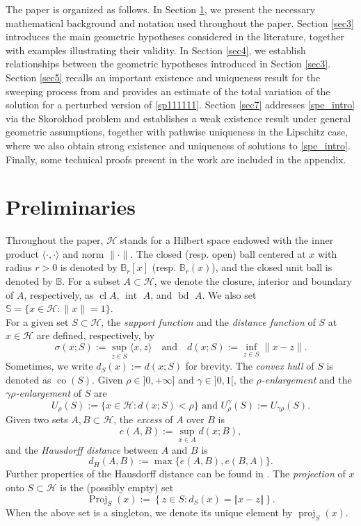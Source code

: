 \documentclass[preprint,12pt]{elsarticle}
\renewcommand{\H}{\mathcal{H}}
\newcommand{\cl}{{\operatorname{cl}}}
\newcommand{\inte}{{\operatorname{int \  }}}
\newcommand{\bd}{{\operatorname{bd \ }}}
\theoremstyle{plain}
\theoremstyle{definition}
\theoremstyle{remark}
\begin{document}
 The paper is organized as follows. In Section \ref{sec2}, we present the necessary mathematical background and notation used throughout the paper. Section \ref{sec3} introduces the main geometric hypotheses considered in the literature, together with examples illustrating their validity. In Section \ref{sec4}, we establish relationships between the geometric hypotheses introduced in Section \ref{sec3}. Section \ref{sec5} recalls an important existence and uniqueness result for the sweeping process from \cite{MR1946545} and provides an estimate of the total variation of the solution for a perturbed version of \eqref{sp111111}. Section \ref{sec7} addresses \eqref{spe_intro} via the Skorokhod problem and establishes a weak existence result under general geometric assumptions, together with pathwise uniqueness in the Lipschitz case, where we also obtain strong existence and uniqueness of solutions to \eqref{spe_intro}. Finally, some technical proofs present in the work are included in the appendix.


\section{Preliminaries}\label{sec2}
	
	Throughout the paper, $\H$ stands for a Hilbert space endowed with the inner product $\langle\cdot,\cdot\rangle$ and norm $\|\cdot\|$. The closed (resp. open) ball centered at $x$ with radius $r>0$ is denoted by $\mathbb{B}_r[x]$ (resp. $\mathbb{B}_r(x)$), and the closed unit ball is denoted by $\mathbb{B}$. For a subset $A\subset\H$, we denote the closure, interior and boundary of $A$, respectively, as $\cl A$, $\inte A$, and $\bd A$. We also set $\mathbb{S} = \{x\in\H : \|x\| = 1\}$.\\
	For a given set $S\subset \H$, the \emph{support function} and the \emph{distance function} of $S$ at $x\in \H$ are defined, respectively, by
	$$
	\sigma(x;S):= \sup_{z\in S}\langle x,z\rangle \quad \textrm{and} \quad d(x;S):=\inf_{z\in S}\|x-z\|.
	$$
    Sometimes, we write $d_S(x):=d(x;S)$ for brevity. The \emph{convex hull}  of $S$ is denoted as $\operatorname{co}(S)$. Given $\rho\in ]0,+\infty]$ and $\gamma\in ]0,1[$, the  \emph{$\rho$-enlargement} and the 
	\emph{$\gamma\rho$-enlargement} of $S$ are 
	$$
	U_\rho(S) := \{x\in \H:d(x;S)<\rho\} \textrm{ and } U_\rho^\gamma(S):=U_{\gamma\rho}(S).
	$$
	Given two sets $A,B\subset \H$, the \emph{excess} of $A$ over $B$ is 
    $$e(A,B) := \sup_{x\in A} d(x;B),$$ and the \emph{Hausdorff distance} between $A$ and $B$ is 
	$$d_H(A,B) := \max\{e(A,B),e(B,A)\}.$$
	Further properties of the Hausdorff distance can be found in \cite[Sec. 3.16]{MR2378491}. The \emph{projection} of $x$ onto $S\subset \H$ is the (possibly empty) set  
$$\operatorname{Proj}_{S}(x):=\left\{z\in S : d_{S}(x)=\Vert x-z\Vert\right\}.$$ When the above set is a singleton, we denote its unique element by $\operatorname{proj}_{S}(x)$.
	
\end{document}
